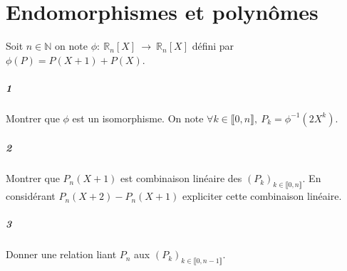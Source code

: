\documentclass[10pt,a4paper]{article}
\begin{document}
\section{Endomorphismes et polynômes}
Soit $n \in \mathbb{N}$ on note $\phi : \ \mathbb{R}_n[X] \ \rightarrow  \ \mathbb{R}_n[X]$ défini par $\phi(P)=P(X+1)+P(X)$.
\subparagraph{1}Montrer que $\phi$ est un isomorphisme. On note $\forall k \in \llbracket 0,n \rrbracket, \ P_k=\phi^{-1}(2X^k)$.
\subparagraph{2}Montrer que $P_n(X+1)$ est combinaison linéaire des $(P_k)_{k \in \llbracket 0,n \rrbracket}$. En considérant $P_n(X+2)-P_n(X+1)$ expliciter cette combinaison linéaire.
\subparagraph{3} Donner une relation liant $P_n$ aux $(P_k)_{k \in \llbracket 0,n-1 \rrbracket}$.
\end{document}
